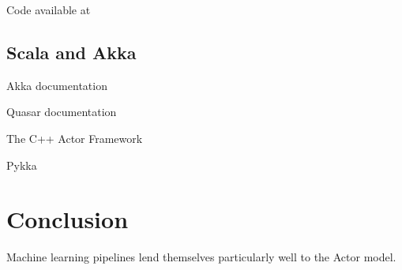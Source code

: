 \documentclass{article}
\begin{document}
Code available at~\cite{gawalt_papis_demo}

\subsection{Scala and Akka}

Akka documentation~\cite{akka_doc}

Quasar documentation~\cite{quasar_doc}

The C++ Actor Framework~\cite{charousset2014caf}

Pykka~\cite{pykka_doc}

\section{Conclusion}

Machine learning pipelines lend themselves particularly well to the Actor model.




\end{document}
